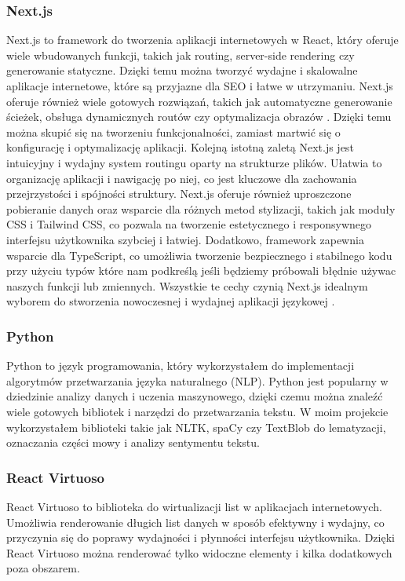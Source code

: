 \subsubsection{Next.js}
Next.js to framework do tworzenia aplikacji internetowych w React, który oferuje wiele wbudowanych funkcji, takich jak routing, server-side rendering czy generowanie statyczne. Dzięki temu można tworzyć wydajne i skalowalne aplikacje internetowe, które są przyjazne dla SEO i łatwe w utrzymaniu. Next.js oferuje również wiele gotowych rozwiązań, takich jak automatyczne generowanie ścieżek, obsługa dynamicznych routów czy optymalizacja obrazów \cite{nextjs}. Dzięki temu można skupić się na tworzeniu funkcjonalności, zamiast martwić się o konfigurację i optymalizację aplikacji.
Kolejną istotną zaletą Next.js jest intuicyjny i wydajny system routingu oparty na strukturze plików. Ułatwia to organizację aplikacji i nawigację po niej, co jest kluczowe dla zachowania przejrzystości i spójności struktury. Next.js oferuje również uproszczone pobieranie danych oraz wsparcie dla różnych metod stylizacji, takich jak moduły CSS i Tailwind CSS, co pozwala na tworzenie estetycznego i responsywnego interfejsu użytkownika szybciej i łatwiej. Dodatkowo, framework zapewnia wsparcie dla TypeScript, co umożliwia tworzenie bezpiecznego i stabilnego kodu przy użyciu typów które nam podkreślą jeśli będziemy próbowali błędnie używac naszych funkcji lub zmiennych. Wszystkie te cechy czynią Next.js idealnym wyborem do stworzenia nowoczesnej i wydajnej aplikacji językowej \cite{bui2023next}.

\subsubsection{Python}
Python to język programowania, który wykorzystałem do implementacji algorytmów przetwarzania języka naturalnego (NLP). Python jest popularny w dziedzinie analizy danych i uczenia maszynowego, dzięki czemu można znaleźć wiele gotowych bibliotek i narzędzi do przetwarzania tekstu. W moim projekcie wykorzystałem biblioteki takie jak NLTK, spaCy czy TextBlob do lematyzacji, oznaczania części mowy i analizy sentymentu tekstu.

\subsubsection{React Virtuoso}
React Virtuoso to biblioteka do wirtualizacji list w aplikacjach internetowych. Umożliwia renderowanie długich list danych w sposób efektywny i wydajny, co przyczynia się do poprawy wydajności i płynności interfejsu użytkownika. Dzięki React Virtuoso można renderować tylko widoczne elementy i kilka dodatkowych poza obszarem.

